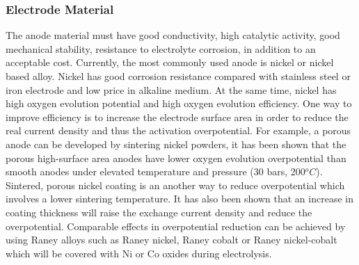 \documentclass[11pt, a4paper]{article}
\begin{document}



\subsubsection{Electrode Material} 
The anode material must have good conductivity, high catalytic activity, good mechanical stability, resistance to electrolyte corrosion, in addition to an acceptable cost. Currently, the most commonly used anode is nickel or nickel based alloy. Nickel has good corrosion resistance compared with stainless steel or iron electrode and low price in alkaline medium. At the same time, nickel has high oxygen evolution potential and high oxygen evolution efficiency. One way to improve efficiency is to increase the electrode surface area in order to reduce the real current density and thus the activation overpotential. For example, a porous anode can be developed by sintering nickel powders, it has been shown that the porous high-surface area anodes have lower oxygen evolution overpotential than smooth anodes under elevated temperature and pressure (30 bars, 200$^oC$). Sintered, porous nickel coating is an another way to reduce overpotential which involves a lower sintering temperature. It has also been shown that an increase in coating thickness will raise the exchange current density and reduce the overpotential. Comparable effects in overpotential reduction can be achieved by using Raney alloys such as Raney nickel, Raney cobalt or Raney nickel-cobalt which will be covered with Ni or Co oxides during electrolysis.\cite{anode} \cite{anode2}
\end{document}
